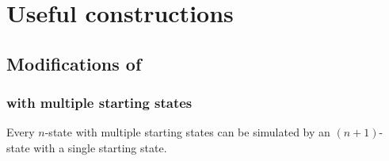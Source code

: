 \chapter{Useful constructions}



\section{Modifications of \NFAs}


\subsection{\NFAs with multiple starting states}
\begin{thrm}\label{thm:mult-start-states}
	Every $n$-state \NFA with multiple starting states can be simulated by an $(n+1)$-state \NFA with a single starting state.
\end{thrm}
